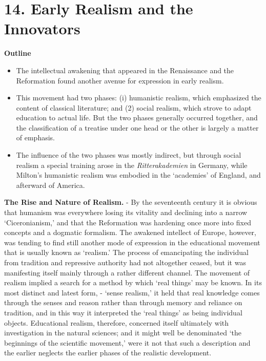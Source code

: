 \documentclass[]{book}
\providecommand{\tightlist}{%
  \setlength{\itemsep}{0pt}\setlength{\parskip}{0pt}}
\begin{document}
\hypertarget{early-realism-and-the-innovators}{%
\chapter{14. Early Realism and the Innovators}\label{early-realism-and-the-innovators}}

\textbf{Outline}

\begin{itemize}
\tightlist
\item
  The intellectual awakening that appeared in the Renaissance and the Reformation found another avenue for expression in early realism.
\item
  This movement had two phases: (i) humanistic realism, which emphasized the content of classical literature; and (2) social realism, which strove to adapt education to actual life. But the two phases generally occurred together, and the classification of a treatise under one head or the other is largely a matter of emphasis.
\item
  The influence of the two phases was mostly indirect, but through social realism a special training arose in the \emph{Ritterakademien} in Germany, while Milton's humanistic realism was embodied in the `academies' of England, and afterward of America.
\end{itemize}

\textbf{The Rise and Nature of Realism.} - By the seventeenth century it is obvious that humanism was everywhere losing its vitality and declining into a narrow `Ciceronianism,' and that the Reformation was hardening once more into fixed concepts and a dogmatic formalism. The awakened intellect of Europe, however, was tending to find still another mode of expression in the educational movement that is usually known as `realism.' The process of emancipating the individual from tradition and repressive authority had not altogether ceased, but it was manifesting itself mainly through a rather different channel. The movement of realism implied a search for a method by which `real things' may be known. In its most distinct and latest form, - `sense realism,' it held that real knowledge comes through the senses and reason rather than through memory and reliance on tradition, and in this way it interpreted the `real things' as being individual objects. Educational realism, therefore, concerned itself ultimately with investigation in the natural sciences; and it might well be denominated `the beginnings of the scientific movement,' were it not that such a description and the earlier neglects the earlier phases of the realistic development.
\end{document}
